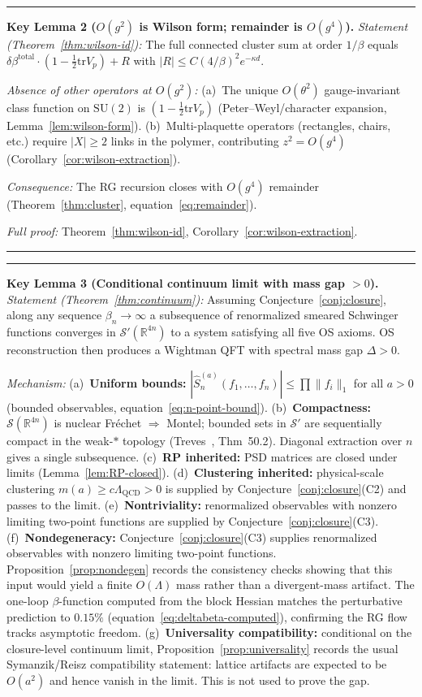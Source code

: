 \documentclass[11pt]{article}
\theoremstyle{definition}
\newcommand{\SU}{\mathrm{SU}}
\newcommand{\tr}{\mathrm{tr}}
\newcommand{\R}{\mathbb{R}}
\newcommand{\Lam}{\Lambda_{\mathrm{QCD}}}
\begin{document}
\medskip\noindent\hrule\smallskip
\textbf{Key Lemma 2 ($O(g^2)$ is Wilson form; remainder is $O(g^4)$).}
\emph{Statement (Theorem~\ref{thm:wilson-id}):}
The full connected cluster sum at order $1/\beta$ equals
$\delta\beta^{\mathrm{total}}\cdot(1-\frac{1}{2}\tr V_p)
+R$ with $|R|\le C(4/\beta)^2 e^{-\kappa d}$.

\emph{Absence of other operators at $O(g^2)$:}
(a)~The unique $O(\theta^2)$ gauge-invariant class function
on $\SU(2)$ is $(1-\frac{1}{2}\tr V_p)$
(Peter--Weyl/character expansion,
Lemma~\ref{lem:wilson-form}).
(b)~Multi-plaquette operators (rectangles, chairs, etc.)
require $|X|\ge 2$ links in the polymer, contributing
$z^2=O(g^4)$ (Corollary~\ref{cor:wilson-extraction}).

\emph{Consequence:}
The RG recursion closes with $O(g^4)$ remainder
(Theorem~\ref{thm:cluster}, equation~\eqref{eq:remainder}).

\emph{Full proof:}
Theorem~\ref{thm:wilson-id},
Corollary~\ref{cor:wilson-extraction}.
\smallskip\hrule\medskip

\medskip\noindent\hrule\smallskip
\textbf{Key Lemma 3 (Conditional continuum limit with mass gap $>0$).}
\emph{Statement (Theorem~\ref{thm:continuum}):}
Assuming Conjecture~\ref{conj:closure}, along any sequence
$\beta_n\to\infty$ a subsequence of renormalized smeared Schwinger
functions converges in $\mathcal{S}'(\R^{4n})$ to a system satisfying
all five OS axioms.  OS reconstruction then produces a Wightman QFT
with spectral mass gap $\Delta>0$.

\emph{Mechanism:}
(a)~\textbf{Uniform bounds:}
$|\hat S_n^{(a)}(f_1,\ldots,f_n)|\le\prod\|f_i\|_1$
for all $a>0$ (bounded observables,
equation~\eqref{eq:n-point-bound}).
(b)~\textbf{Compactness:}
$\mathcal{S}(\R^{4n})$ is nuclear Fr\'echet $\Rightarrow$ Montel;
bounded sets in $\mathcal{S}'$ are sequentially compact
in the weak-$*$ topology
(Treves~\cite{Treves}, Thm~50.2).
Diagonal extraction over $n$ gives a single subsequence.
(c)~\textbf{RP inherited:} PSD matrices are closed
under limits (Lemma~\ref{lem:RP-closed}).
(d)~\textbf{Clustering inherited:}
physical-scale clustering $m(a)\ge c\Lam>0$ is supplied by
Conjecture~\ref{conj:closure}(C2) and passes to the limit.
(e)~\textbf{Nontriviality:}
renormalized observables with nonzero limiting two-point functions are
supplied by Conjecture~\ref{conj:closure}(C3).
(f)~\textbf{Nondegeneracy:}
Conjecture~\ref{conj:closure}(C3) supplies renormalized observables with nonzero limiting two-point functions.  Proposition~\ref{prop:nondegen} records the consistency checks showing that this input would yield a finite $O(\Lambda)$ mass rather than a divergent-mass artifact.
The one-loop $\beta$-function computed from the block Hessian
matches the perturbative prediction to $0.15\%$
(equation~\eqref{eq:deltabeta-computed}), confirming the RG
flow tracks asymptotic freedom.
(g)~\textbf{Universality compatibility:}
conditional on the closure-level continuum limit, Proposition~\ref{prop:universality} records the usual Symanzik/Reisz compatibility statement: lattice artifacts are expected to be $O(a^2)$ and hence vanish in the limit.  This is not used to prove the gap.
\end{document}
